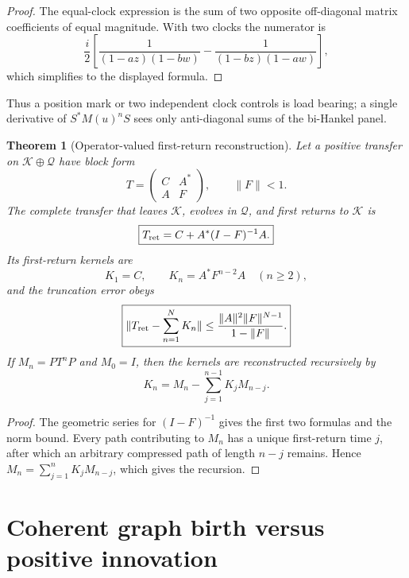 \documentclass[11pt,oneside,openany]{book}
\numberwithin{equation}{chapter}
\newtheorem{theorem}{Theorem}[chapter]
\theoremstyle{definition}
\theoremstyle{remark}
\newcommand{\norm}[1]{\lVert #1\rVert}
\begin{document}
\begin{proof}
The equal-clock expression is the sum of two opposite off-diagonal matrix
coefficients of equal magnitude.  With two clocks the numerator is
\[
 \frac{i}{2}\left[
 \frac{1}{(1-az)(1-bw)}
 -\frac{1}{(1-bz)(1-aw)}
 \right],
\]
which simplifies to the displayed formula.
\end{proof}

Thus a position mark or two independent clock controls is load bearing; a
single derivative of \(S^*M(u)^nS\) sees only anti-diagonal sums of the
bi-Hankel panel.

\begin{theorem}[Operator-valued first-return reconstruction]
\label{thm:v6-first-return}
Let a positive transfer on
\(\mathcal K\oplus\mathcal Q\) have block form
\[
 T=\begin{pmatrix}C&A^*\\A&F\end{pmatrix},
 \qquad \norm F<1.
\]
The complete transfer that leaves \(\mathcal K\), evolves in
\(\mathcal Q\), and first returns to \(\mathcal K\) is
\[
 \boxed{T_{\rm ret}=C+A^*(I-F)^{-1}A.}
\]
Its first-return kernels are
\[
 K_1=C,
 \qquad
 K_n=A^*F^{n-2}A\quad(n\ge2),
\]
and the truncation error obeys
\[
 \boxed{
 \norm{T_{\rm ret}-\sum_{n=1}^{N}K_n}
 \le \frac{\norm{A}^2\norm{F}^{N-1}}{1-\norm{F}}.}
\]
If \(M_n=PT^nP\) and \(M_0=I\), then the kernels are reconstructed
recursively by
\[
 \boxed{K_n=M_n-\sum_{j=1}^{n-1}K_jM_{n-j}.}
\]
\end{theorem}

\begin{proof}
The geometric series for \((I-F)^{-1}\) gives the first two formulas and the
norm bound.  Every path contributing to \(M_n\) has a unique first-return
time \(j\), after which an arbitrary compressed path of length \(n-j\)
remains.  Hence
\(M_n=\sum_{j=1}^nK_jM_{n-j}\), which gives the recursion.
\end{proof}

\section{Coherent graph birth versus positive innovation}
\end{document}
